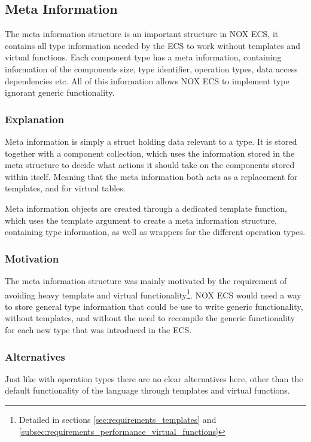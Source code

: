 \subsection{Meta Information}
\label{subsec:detailed_meta_information}
The meta information structure is an important structure in NOX ECS,
it contains all type information needed by the ECS to work without
templates and virtual functions.
Each component type has a meta information, containing information
of the components size, type identifier,
operation types, data access dependencies etc.
All of this information allows NOX ECS to implement type ignorant generic functionality.

\subsubsection{Explanation}
Meta information is simply a struct holding data relevant to a type.
It is stored together with a component collection,
which uses the information stored in the meta structure to decide what actions
it should take on the components stored within itself.
Meaning that the meta information both acts as a replacement for templates,
and for virtual tables.

Meta information objects are created through a dedicated template function,
which uses the template argument to create a meta information structure,
containing type information, as well as wrappers for the different operation types.

\subsubsection{Motivation}
The meta information structure was mainly motivated by the requirement of avoiding heavy template and virtual functionality\footnote{Detailed in sections \ref{sec:requirements_templates} and \ref{subsec:requirements_performance_virtual_functions}}.
NOX ECS would need a way to store general type information that could be use to write generic functionality, without templates,
and without the need to recompile the generic functionality for each new type that was introduced in the ECS.

\subsubsection{Alternatives}
Just like with operation types there are no clear alternatives here, other than
the default functionality of the language through templates and virtual functions.

